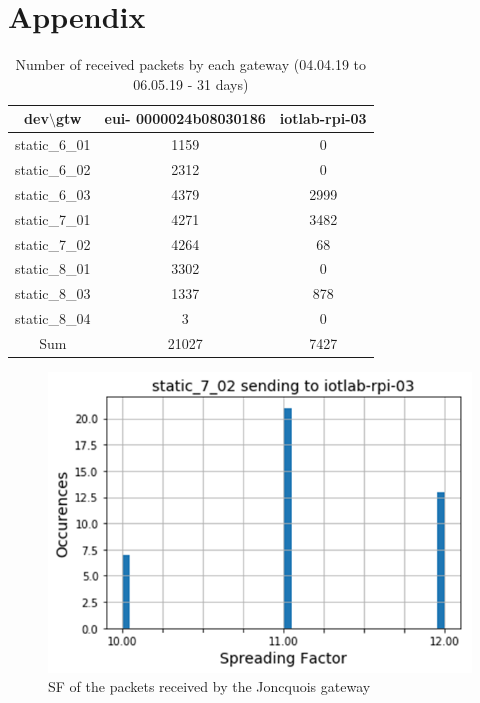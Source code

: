 \documentclass[letterpaper, 10 pt, conference]{ieeeconf}  %
\begin{document}
\section*{Appendix}

\begin{table}[htbp]
\begin{center} 
\begin{tabular}{|c|c|c|}
  \hline
    dev$\setminus$gtw & eui-
0000024b08030186 & iotlab-rpi-03 \\
  \hline
  static\_6\_01 & 1159 & 0 \\
  \hline
  static\_6\_02 & 2312 & 0 \\
  \hline
  static\_6\_03 & 4379 & 2999 \\
  \hline
  static\_7\_01 & 4271 & 3482 \\
  \hline
  static\_7\_02 & 4264 & 68 \\
  \hline
  static\_8\_01 & 3302 & 0 \\
  \hline
  static\_8\_03 & 1337 & 878 \\
  \hline
  static\_8\_04 & 3 & 0 \\
  \hline
  \hline
  Sum & 21027 & 7427 \\
  \hline
  \end{tabular}
  \end{center}
 \caption{Number of received packets by each gateway (04.04.19 to 06.05.19 - 31 days)\label{table_packets}}
\end{table}

\begin{figure}[hb!]
\centering
\includegraphics[scale=0.45]{sf_7_02.png}
\caption{SF of the packets received by the Joncquois gateway}
\label{sf_7_02}
\end{figure}
\end{document}
